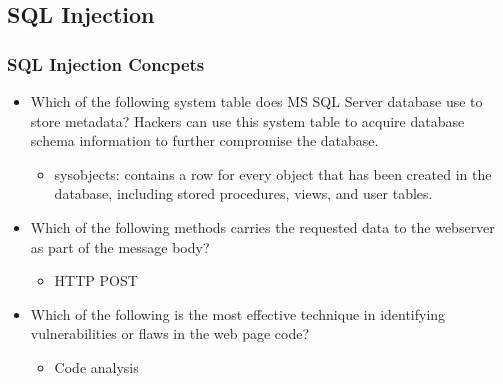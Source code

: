 \subsection{SQL Injection}
\subsubsection{SQL Injection Concpets}
\begin{itemize}
    \item Which of the following system table does MS SQL Server database use to store metadata? Hackers can use this system table to acquire database schema information to further compromise the database.
    \begin{itemize}
        \item sysobjects: contains a row for every object that has been created in the database, including stored procedures, views, and user tables.
    \end{itemize}
    \item Which of the following methods carries the requested data to the webserver as part of the message body?
    \begin{itemize}
        \item HTTP POST
    \end{itemize}
    \item Which of the following is the most effective technique in identifying vulnerabilities or flaws in the web page code?
    \begin{itemize}
        \item Code analysis
    \end{itemize}
\end{itemize}
